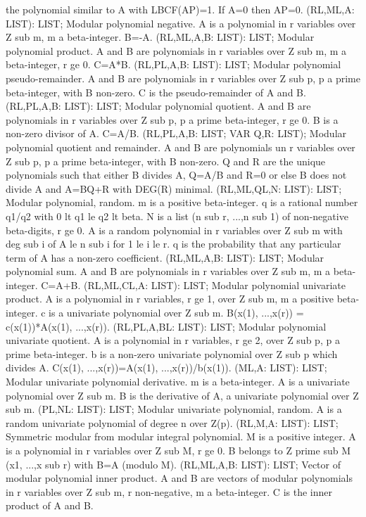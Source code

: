 the polynomial similar to A with LBCF(AP)=1. If A=0 then AP=0. \ecom 
{} (RL,ML,A: LIST): LIST; \eproc
\bcom Modular polynomial negative. A is a polynomial in r variables over
Z sub m, m a beta-integer. B=-A. \ecom 
{} (RL,ML,A,B: LIST): LIST; \eproc
\bcom Modular polynomial product. A and B are polynomials in r variables
over Z sub m, m a beta-integer, r ge 0. C=A*B. \ecom 
{} (RL,PL,A,B: LIST): LIST; \eproc
\bcom Modular polynomial pseudo-remainder. A and B are polynomials
in r variables over Z sub p, p a prime beta-integer,
with B non-zero. C is the pseudo-remainder of A and B. \ecom 
{} (RL,PL,A,B: LIST): LIST; \eproc
\bcom Modular polynomial quotient. A and B are polynomials in r
variables over Z sub p, p a prime beta-integer, r ge 0.  B is a
non-zero divisor of A. C=A/B. \ecom 
{} (RL,PL,A,B: LIST; VAR Q,R: LIST); \eproc
\bcom Modular polynomial quotient and remainder. A and B are polynomials
un r variables over Z sub p, p a prime beta-integer, with B non-zero.
Q and R are the unique polynomials such that either B divides A, Q=A/B
and R=0 or else B does not divide A and A=BQ+R with DEG(R) minimal. \ecom 
{} (RL,ML,QL,N: LIST): LIST; \eproc
\bcom Modular polynomial, random. m is a positive beta-integer. q is a
rational number q1/q2 with 0 lt q1 le q2 lt beta.  N is a list (n
sub r, ...,n sub 1) of non-negative beta-digits, r ge 0.  A is a
random polynomial in r variables over Z sub m with deg sub i of A le
n sub i for 1 le i le r.  q is the probability that any particular
term of A has a non-zero coefficient. \ecom 
{} (RL,ML,A,B: LIST): LIST; \eproc
\bcom Modular polynomial sum. A and B are polynomials in r variables over
Z sub m, m a beta-integer. C=A+B. \ecom 
{} (RL,ML,CL,A: LIST): LIST; \eproc
\bcom Modular polynomial univariate product. A is a polynomial in r
variables, r ge 1, over Z sub m, m a positive beta-integer.  c is a
univariate polynomial over Z sub m.  B(x(1), ...,x(r)) =
c(x(1))*A(x(1), ...,x(r)). \ecom 
{} (RL,PL,A,BL: LIST): LIST; \eproc
\bcom Modular polynomial univariate quotient. A is a polynomial in r
variables, r ge 2, over Z sub p, p a prime beta-integer.  b is a
non-zero univariate polynomial over Z sub p which divides A.
C(x(1), ...,x(r))=A(x(1), ...,x(r))/b(x(1)). \ecom 
{} (ML,A: LIST): LIST; \eproc
\bcom Modular univariate polynomial derivative. m is a beta-integer. A
is a univariate polynomial over Z sub m.  B is the derivative of A, a
univariate polynomial over Z sub m. \ecom 
{} (PL,NL: LIST): LIST; \eproc
\bcom Modular univariate polynomial, random. A is a random univariate
polynomial of degree n over Z(p). \ecom 
{} (RL,M,A: LIST): LIST; \eproc
\bcom Symmetric modular from modular integral polynomial. M is a positive
integer.  A is a polynomial in r variables over Z sub M, r ge 0.  B
belongs to Z prime sub M (x1, ...,x sub r) with B=A (modulo M). \ecom 
{} (RL,ML,A,B: LIST): LIST; \eproc
\bcom Vector of modular polynomial inner product. A and B are vectors of
modular polynomials in r variables over Z sub m, r non-negative, m
a beta-integer. C is the inner product of A and B. \ecom 
